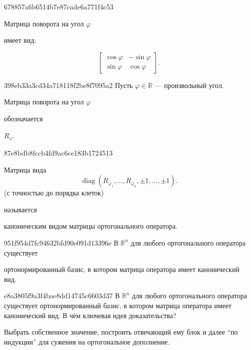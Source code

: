 \begin{note}{678857a6b6514b7e87cade6a771f4c53}
    \begin{icloze}{2}Матрица поворота на угол \({ \varphi }\)\end{icloze} имеет вид:
    \begin{icloze}{1}
        \[
            \begin{bmatrix}
                \cos \varphi & -\sin \varphi \\
                \sin \varphi & \cos \varphi
            \end{bmatrix}.
        \]
    \end{icloze}
\end{note}

\begin{note}{398eb33a3cd34a718118f2be8f7095a2}
    Пусть \({ \varphi \in \mathbb R }\) --- произвольный угол.
    \begin{icloze}{1}Матрица поворота на угол \({ \varphi }\)\end{icloze} обозначается \begin{icloze}{2}\({ R_{\varphi} }\).\end{icloze}
\end{note}

\begin{note}{87e8bdb8fccb4fd9ac6ce183b1724513}
    \begin{icloze}{1}
        Матрица вида
        \[
            \operatorname{diag}(R_{\varphi_1}, \ldots, R_{\varphi_k}, \pm 1, \ldots, \pm 1).
        \]
    (с точностью до порядка клеток)
    \end{icloze}
    называется \begin{icloze}{2}каноническим видом матрицы ортогонального оператора.\end{icloze}
\end{note}

\begin{note}{951f954d7fc94632bfd90e091d13396e}
    В \({ \mathbb R^{n} }\) для любого ортогонального оператора существует \begin{icloze}{1}ортонормированный базис, в котором матрица оператора имеет канонический вид.\end{icloze}
\end{note}

\begin{note}{e8a3805f9a3f4bae8dd14745c6603d37}
    В \({ \mathbb R^{n} }\) для любого ортогонального оператора существует ортонормированный базис, в котором матрица оператора имеет канонический вид.
    В чём ключевая идея доказательства?

    \begin{cloze}{1}
        Выбрать собственное значение, построить отвечающий ему блок и далее ``по индукции'' для сужения на ортогональное дополнение.
    \end{cloze}
\end{note}

